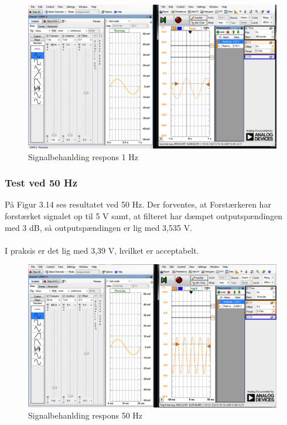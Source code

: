 \begin{figure}[H]
	\centering
	\includegraphics[width=1\textwidth]{Figurer/Snip20151207_42}	\caption{Signalbehanlding respons 1 Hz}
	\label{fig:Signalbehanlding}
\end{figure}

\subsubsection{Test ved 50 Hz}
På Figur 3.14 ses resultatet ved 50 Hz. Der forventes, at Forstærkeren har forstærket signalet op til 5 V samt, at filteret har dæmpet outputspændingen med 3 dB, så outputspændingen er lig med 3,535 V. 
\\ \\
I praksis er det lig med 3,39 V, hvilket er acceptabelt.    
  

\begin{figure}[H]
	\centering
	\includegraphics[width=1\textwidth]{Figurer/Snip20151207_43}
	\caption{Signalbehanlding respons 50 Hz}
	\label{fig:Signalbehanlding}
\end{figure}


